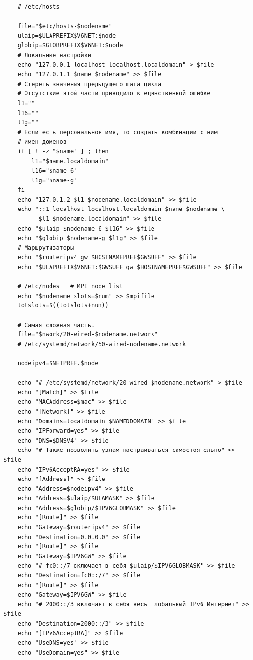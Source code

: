 \documentclass[12pt]{article}
\begin{document}
\begin{verbatim}
    # /etc/hosts

    file="$etc/hosts-$nodename"
    ulaip=$ULAPREFIX$V6NET:$node
    globip=$GLOBPREFIX$V6NET:$node
    # Локальные настройки
    echo "127.0.0.1 localhost localhost.localdomain" > $file
    echo "127.0.1.1 $name $nodename" >> $file
    # Стереть значения предыдущего шага цикла
    # Отсутствие этой части приводило к единственной ошибке
    l1=""
    l16=""
    l1g=""
    # Если есть персональное имя, то создать комбинации с ним
    # имен доменов
    if [ ! -z "$name" ] ; then
        l1="$name.localdomain"
        l16="$name-6"
        l1g="$name-g"
    fi
    echo "127.0.1.2 $l1 $nodename.localdomain" >> $file
    echo "::1 localhost localhost.localdomain $name $nodename \
          $l1 $nodename.localdomain" >> $file
    echo "$ulaip $nodename-6 $l16" >> $file
    echo "$globip $nodename-g $l1g" >> $file
    # Маршрутизаторы
    echo "$routeripv4 gw $HOSTNAMEPREF$GWSUFF" >> $file
    echo "$ULAPREFIX$V6NET:$GWSUFF gw $HOSTNAMEPREF$GWSUFF" >> $file

    # /etc/nodes   # MPI node list
    echo "$nodename slots=$num" >> $mpifile
    totslots=$((totslots+num))

    # Самая сложная часть.
    file="$nwork/20-wired-$nodename.network"
    # /etc/systemd/network/50-wired-nodename.network

    nodeipv4=$NETPREF.$node

    echo "# /etc/systemd/network/20-wired-$nodename.network" > $file
    echo "[Match]" >> $file
    echo "MACAddress=$mac" >> $file
    echo "[Network]" >> $file
    echo "Domains=localdomain $NAMEDDOMAIN" >> $file
    echo "IPForward=yes" >> $file
    echo "DNS=$DNSV4" >> $file
    echo "# Также позволить узлам настраиваться самостоятельно" >> $file
    echo "IPv6AcceptRA=yes" >> $file
    echo "[Address]" >> $file
    echo "Address=$nodeipv4" >> $file
    echo "Address=$ulaip/$ULAMASK" >> $file
    echo "Address=$globip/$IPV6GLOBMASK" >> $file
    echo "[Route]" >> $file
    echo "Gateway=$routeripv4" >> $file
    echo "Destination=0.0.0.0" >> $file
    echo "[Route]" >> $file
    echo "Gateway=$IPV6GW" >> $file
    echo "# fc0::/7 включает в себя $ulaip/$IPV6GLOBMASK" >> $file
    echo "Destination=fc0::/7" >> $file
    echo "[Route]" >> $file
    echo "Gateway=$IPV6GW" >> $file
    echo "# 2000::/3 включает в себя весь глобальный IPv6 Интернет" >> $file
    echo "Destination=2000::/3" >> $file
    echo "[IPv6AcceptRA]" >> $file
    echo "UseDNS=yes" >> $file
    echo "UseDomain=yes" >> $file


\end{verbatim}
\end{document}
